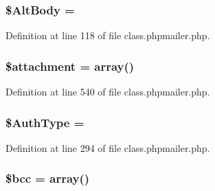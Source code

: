 \subsubsection[{\texorpdfstring{\$\+Alt\+Body}{$AltBody}}]{\setlength{\rightskip}{0pt plus 5cm}\$Alt\+Body = \textquotesingle{}\textquotesingle{}}\hypertarget{class_p_h_p_mailer_a5a3adc4eeed7620a1290e2364cee9084}{}\label{class_p_h_p_mailer_a5a3adc4eeed7620a1290e2364cee9084}


Definition at line 118 of file class.\+phpmailer.\+php.

\subsubsection[{\texorpdfstring{\$attachment}{$attachment}}]{\setlength{\rightskip}{0pt plus 5cm}\$attachment = array()\hspace{0.3cm}{\ttfamily [protected]}}\hypertarget{class_p_h_p_mailer_a4019bc6f2f49dc44acb1b4168505b19e}{}\label{class_p_h_p_mailer_a4019bc6f2f49dc44acb1b4168505b19e}


Definition at line 540 of file class.\+phpmailer.\+php.

\subsubsection[{\texorpdfstring{\$\+Auth\+Type}{$AuthType}}]{\setlength{\rightskip}{0pt plus 5cm}\$Auth\+Type = \textquotesingle{}\textquotesingle{}}\hypertarget{class_p_h_p_mailer_afd91ef8cbbb4321e6d963b8189dc1f84}{}\label{class_p_h_p_mailer_afd91ef8cbbb4321e6d963b8189dc1f84}


Definition at line 294 of file class.\+phpmailer.\+php.

\subsubsection[{\texorpdfstring{\$bcc}{$bcc}}]{\setlength{\rightskip}{0pt plus 5cm}\$bcc = array()\hspace{0.3cm}{\ttfamily [protected]}}\hypertarget{class_p_h_p_mailer_a5e11ecd89692e5b6bfa3702c7894e23d}{}\label{class_p_h_p_mailer_a5e11ecd89692e5b6bfa3702c7894e23d}


